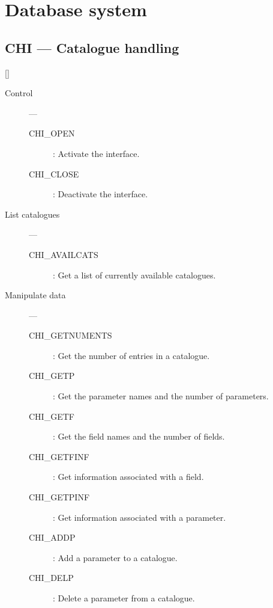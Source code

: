 \newpage

\section{Database system}

\subsection{CHI --- Catalogue handling}

\vspace{-9mm}

\hfill []

\vspace{2mm}

\begin{description}

\item [Control] ---

\begin{description}
\item [CHI\_OPEN] : Activate the interface.
\item [CHI\_CLOSE] : Deactivate the interface.
\end{description}

\item [List catalogues] ---

\begin{description}
\item [CHI\_AVAILCATS] :  Get a list of currently available catalogues.
\end{description}

\item [Manipulate data] ---

\begin{description}
\item [CHI\_GETNUMENTS] : Get the number of entries in a catalogue.
\item [CHI\_GETP] : Get the parameter names and the number of parameters.
\item [CHI\_GETF] : Get the field names and the number of fields.
\item [CHI\_GETFINF] : Get information associated with a field.
\item [CHI\_GETPINF] : Get information associated with a parameter.
\item [CHI\_ADDP] : Add a parameter to a catalogue.
\item [CHI\_DELP] : Delete a parameter from a catalogue.
\end{description}


\end{description}
